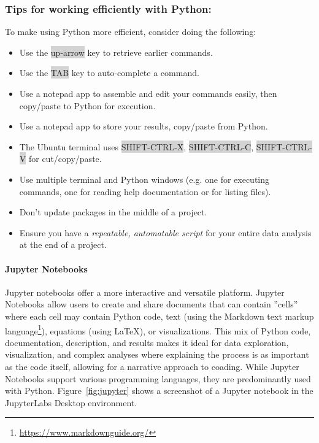 \begin{tcolorbox}[colback=code]
\subsubsection*{Tips for working efficiently with Python:}

To make using Python more efficient, consider doing the following:

\begin{itemize}
    \item Use the {\footnotesize\colorbox{lightgray}{up-arrow}} key to retrieve earlier commands.
    \item Use the {\footnotesize\colorbox{lightgray}{TAB}} key to auto-complete a command.
    \item Use a notepad app to assemble and edit your commands easily, then copy/paste to Python for execution.
    \item Use a notepad app to store your results, copy/paste from Python.
    \item The Ubuntu terminal uses {\footnotesize\colorbox{lightgray}{SHIFT-CTRL-X}}, {\footnotesize\colorbox{lightgray}{SHIFT-CTRL-C}}, {\footnotesize\colorbox{lightgray}{SHIFT-CTRL-V}} for cut/copy/paste.
    \item Use multiple terminal and Python windows (e.g. one for executing commands, one for reading help documentation or for listing files).
    \item Don't update packages in the middle of a project.
    \item Ensure you have a \emph{repeatable, automatable script} for your entire data analysis at the end of a project.
\end{itemize}

\end{tcolorbox}

\paragraph*{Jupyter Notebooks} Jupyter notebooks offer a more interactive and versatile platform. Jupyter Notebooks allow users to create and share documents that can contain ''cells'' where each cell may contain Python code, text (using the Markdown text markup language\footnote{\url{https://www.markdownguide.org/}}), equations (using LaTeX), or visualizations. This mix of Python code, documentation, description, and results makes it ideal for data exploration, visualization, and complex analyses where explaining the process is as important as the code itself, allowing for a narrative approach to coading. While Jupyter Notebooks support various programming languages, they are predominantly used with Python. Figure~\ref{fig:jupyter} shows a screenshot of a Jupyter notebook in the JupyterLabs Desktop environment.

